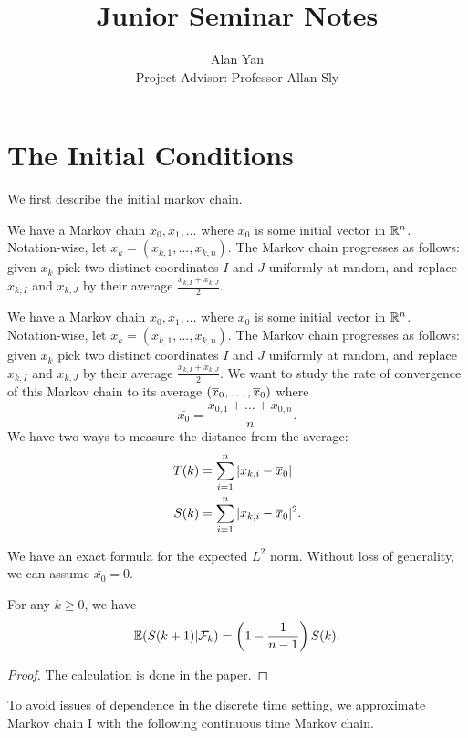 \documentclass[12pt]{article}
\title{Junior Seminar Notes}
\author{Alan Yan \\ Project Advisor: Professor Allan Sly}
\begin{document}
\maketitle
\tableofcontents

\newpage 

\section{The Initial Conditions}

We first describe the initial markov chain. 
\begin{defn}
	We have a Markov chain $x_0, x_1, \ldots$ where $x_0$ is some initial vector in $\mathbb{R}^n$. Notation-wise, let $x_k = (x_{k, 1}, \ldots, x_{k,n})$. The Markov chain progresses as follows: given $x_k$ pick two distinct coordinates $I$ and $J$ uniformly at random, and replace $x_{k, I}$ and $x_{k, J}$ by their average $\frac{x_{k, I} + x_{k, J}}{2}$.
\end{defn}
We have a Markov chain $x_0, x_1, \ldots$ where $x_0$ is some initial vector in $\mathbb{R}^n$. Notation-wise, let $x_k = (x_{k, 1}, \ldots, x_{k,n})$. The Markov chain progresses as follows: given $x_k$ pick two distinct coordinates $I$ and $J$ uniformly at random, and replace $x_{k, I}$ and $x_{k, J}$ by their average $\frac{x_{k, I} + x_{k, J}}{2}$. We want to study the rate of convergence of this Markov chain to its average $(\overline{x}_0, \ldots, \overline{x}_0)$ where
\[
	\bar{x_0} = \frac{x_{0, 1} + \ldots + x_{0, n}}{n}.	
\]
We have two ways to measure the distance from the average: 
\begin{align*}
	T(k) & = \sum_{i = 1}^n |x_{k, i} - \overline{x}_0| \\
	S(k) & = \sum_{i = 1}^n |x_{k, i} - \overline{x}_0|^2.
\end{align*}

We have an exact formula for the expected $L^2$ norm. Without loss of generality, we can assume $\bar{x_0} = 0$. 

\begin{prop}
	For any $k \geq 0$, we have 
	\[
		\mathbb{E} (S(k+1) | \mathcal{F}_k) = \left ( 1 - \frac{1}{n-1} \right ) S(k).
	\]	
\end{prop}
\begin{proof}
	The calculation is done in the paper. 
\end{proof}

To avoid issues of dependence in the discrete time setting, we approximate Markov chain I with the following continuous time Markov chain. 
\end{document}

